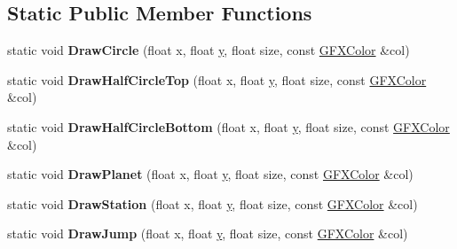 \subsection*{Static Public Member Functions}
\begin{DoxyCompactItemize}
\item 
static void {\bfseries Draw\+Circle} (float x, float \hyperlink{IceUtils_8h_aa7ffaed69623192258fb8679569ff9ba}{y}, float size, const \hyperlink{structGFXColor}{G\+F\+X\+Color} \&col)\hypertarget{classNavigationSystem_a537dc213b32ce635f064ab81844c0e95}{}\label{classNavigationSystem_a537dc213b32ce635f064ab81844c0e95}

\item 
static void {\bfseries Draw\+Half\+Circle\+Top} (float x, float \hyperlink{IceUtils_8h_aa7ffaed69623192258fb8679569ff9ba}{y}, float size, const \hyperlink{structGFXColor}{G\+F\+X\+Color} \&col)\hypertarget{classNavigationSystem_a6d46eed1f4b3fde1329b15fec3ffda0e}{}\label{classNavigationSystem_a6d46eed1f4b3fde1329b15fec3ffda0e}

\item 
static void {\bfseries Draw\+Half\+Circle\+Bottom} (float x, float \hyperlink{IceUtils_8h_aa7ffaed69623192258fb8679569ff9ba}{y}, float size, const \hyperlink{structGFXColor}{G\+F\+X\+Color} \&col)\hypertarget{classNavigationSystem_ac6f03f9e0eccac6ed5bd0d701ddea6a6}{}\label{classNavigationSystem_ac6f03f9e0eccac6ed5bd0d701ddea6a6}

\item 
static void {\bfseries Draw\+Planet} (float x, float \hyperlink{IceUtils_8h_aa7ffaed69623192258fb8679569ff9ba}{y}, float size, const \hyperlink{structGFXColor}{G\+F\+X\+Color} \&col)\hypertarget{classNavigationSystem_afc7564255687636f3965e8696b16abf8}{}\label{classNavigationSystem_afc7564255687636f3965e8696b16abf8}

\item 
static void {\bfseries Draw\+Station} (float x, float \hyperlink{IceUtils_8h_aa7ffaed69623192258fb8679569ff9ba}{y}, float size, const \hyperlink{structGFXColor}{G\+F\+X\+Color} \&col)\hypertarget{classNavigationSystem_a2da3e50cbffae6edbdf89fb665396f83}{}\label{classNavigationSystem_a2da3e50cbffae6edbdf89fb665396f83}

\item 
static void {\bfseries Draw\+Jump} (float x, float \hyperlink{IceUtils_8h_aa7ffaed69623192258fb8679569ff9ba}{y}, float size, const \hyperlink{structGFXColor}{G\+F\+X\+Color} \&col)\hypertarget{classNavigationSystem_a47b84646f57017c04567470dd58d1808}{}\label{classNavigationSystem_a47b84646f57017c04567470dd58d1808}


\end{DoxyCompactItemize}
